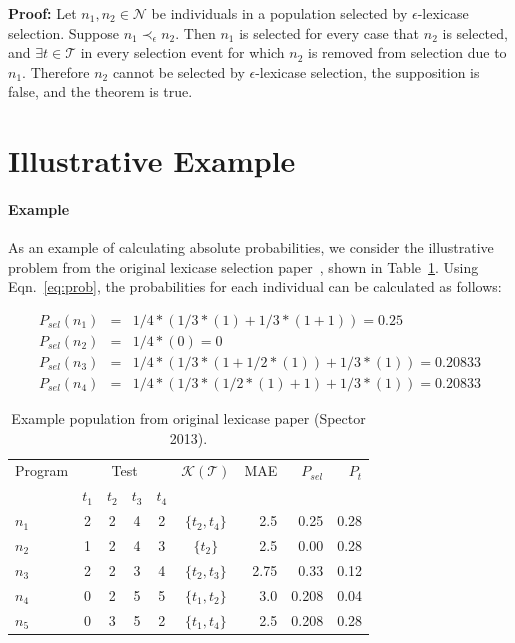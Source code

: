 \documentclass[preprint]{article}
\begin{document}
\noindent \textbf{Proof:} Let $n_1, n_2 \in \mathcal{N}$ be individuals in a population selected by $\epsilon$-lexicase selection. Suppose $n_1 \prec_{\epsilon} n_2$. Then $n_1$ is selected for every case that $n_2$ is selected, and $\exists t \in \mathcal{T}$ in every selection event for which $n_2$ is removed from selection due to $n_1$. Therefore $n_2$ cannot be selected by $\epsilon$-lexicase selection, the supposition is false, and the theorem is true. 
\bigskip

\section{Illustrative Example}
\paragraph{Example}
As an example of calculating absolute probabilities, we consider the illustrative problem from the original lexicase selection paper~\cite{spector_assessment_2013}, shown in Table~\ref{tbl:ex}. Using Eqn.~\ref{eq:prob}, the probabilities for each individual can be calculated as follows:

\begin{align*}
P_{sel}(n_1) &=& 1/4*(1/3*(1)+1/3*(1+1)) = 0.25 \\
P_{sel}(n_2) &=& 1/4*(0) = 0 \\
P_{sel}(n_3) &=&1/4*(1/3*(1+1/2*(1))+1/3*(1)) = 0.20833 \\
P_{sel}(n_4) &=& 1/4*(1/3*(1/2*(1)+1)+1/3*(1)) = 0.20833 
\end{align*}

\begin{table}
\centering
\caption{Example population from original lexicase paper (Spector 2013).}\label{tbl:ex}
\begin{tabular}{l|cccc|c|r|rr}
Program & \multicolumn{4}{c}{Test} & $\mathcal{K}(\mathcal{T})$ & MAE & $P_{sel}$ & $P_{t}$\\
& $t_1$ & $t_2$ & $t_3$ & $t_4$ & \\ \hline
$n_1$ & 2 & 2 & 4 & 2 & $\{t_2,t_4\}$ &	2.5		&	0.25 	& 	0.28	\\
$n_2$ & 1 & 2 & 4 & 3 & $\{t_2\}$		&	2.5		&	0.00	&	0.28	\\
$n_3$ & 2 & 2 & 3 & 4 & $\{t_2,t_3\}$ &	2.75	& 	0.33	&	0.12	\\
$n_4$ & 0 & 2 & 5 & 5 & $\{t_1,t_2\}$ &	3.0		& 	0.208	&	0.04	\\
$n_5$ & 0 & 3 & 5 & 2 & $\{t_1,t_4\}$ &	2.5		&	0.208	&	0.28
\end{tabular}
\end{table}
\end{document}

